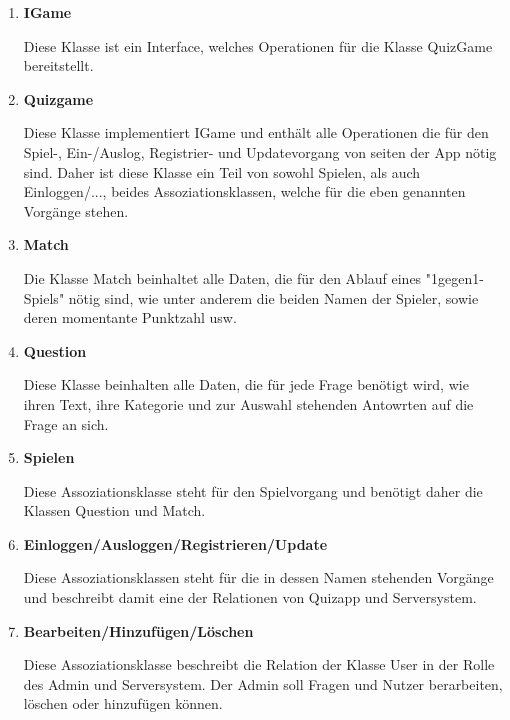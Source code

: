 \begin{enumerate}
	\item{\textbf{IGame}}
	
	Diese Klasse ist ein Interface, welches Operationen für die Klasse QuizGame bereitstellt.
	
	\item{\textbf{Quizgame}}
	
	Diese Klasse implementiert IGame und enthält alle Operationen die für den Spiel-, Ein-/Auslog, Registrier- und Updatevorgang von seiten der App
	nötig sind. Daher ist diese Klasse ein Teil von sowohl Spielen, als auch Einloggen/..., beides Assoziationsklassen, welche für die eben genannten Vorgänge
	stehen.
	
	\item{\textbf{Match}}
	
	Die Klasse Match beinhaltet alle Daten, die für den Ablauf eines "1gegen1-Spiels" nötig sind, wie unter anderem die beiden Namen der Spieler, sowie deren momentante Punktzahl usw.
	
	\item{\textbf{Question}}
	
	Diese Klasse beinhalten alle Daten, die für jede Frage benötigt wird, wie ihren Text, ihre Kategorie und zur Auswahl stehenden Antowrten auf die Frage an sich.
	
	\item{\textbf{Spielen}}
	
	Diese Assoziationsklasse steht für den Spielvorgang und benötigt daher die Klassen Question und Match. 
	
	\item{\textbf{Einloggen/Ausloggen/Registrieren/Update}}
	
	Diese Assoziationsklassen steht für die in dessen Namen stehenden Vorgänge und beschreibt damit eine der Relationen von Quizapp und Serversystem.
	
	\item{\textbf{Bearbeiten/Hinzufügen/Löschen}}
	
	Diese Assoziationsklasse beschreibt die Relation der Klasse User in der Rolle des Admin und	Serversystem. Der Admin soll Fragen und Nutzer berarbeiten, löschen 
	oder hinzufügen können.
	
\end{enumerate}

